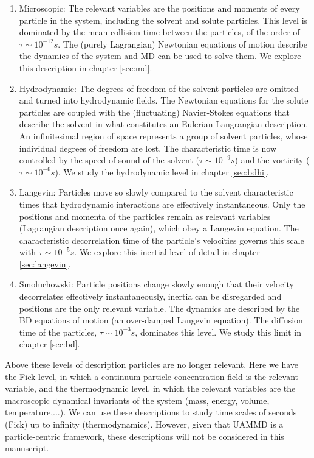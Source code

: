 \documentclass[ twoside,openright,titlepage,numbers=noenddot,%
headinclude,footinclude,cleardoublepage=empty,abstract=on,
BCOR=5mm,paper=b5,fontsize=11pt, dvipsnames
]{scrreprt}
\newcommand{\uammd}{\gls{UAMMD}\xspace}
\begin{document}
\begin{enumerate}
\item Microscopic: The relevant variables are the positions and moments of every particle in the system, including the solvent and solute particles. This level is dominated by the mean collision time between the particles, of the order of $\tau \sim 10^{-12} s$. The (purely Lagrangian) Newtonian equations of motion describe the dynamics of the system and \gls{MD} can be used to solve them. We explore this description in chapter \ref{sec:md}.
\item Hydrodynamic: The degrees of freedom of the solvent particles are omitted and turned into hydrodynamic fields. The Newtonian equations for the solute particles are coupled with the (fluctuating) Navier-Stokes equations that describe the solvent in what constitutes an Eulerian-Langrangian description. An infinitesimal region of space represents a group of solvent particles, whose individual degrees of freedom are lost. The characteristic time is now controlled by the speed of sound of the solvent ($\tau \sim 10^{-9}s$) and the vorticity ($\tau \sim 10^{-6}s$). We study the hydrodynamic level in chapter \ref{sec:bdhi}.
\item Langevin: Particles move so slowly compared to the solvent characteristic times that hydrodynamic interactions are effectively instantaneous. Only the positions and momenta of the particles remain as relevant variables (Lagrangian description once again), which obey a Langevin equation. The characteristic decorrelation time of the particle's velocities governs this scale with $\tau\sim 10^{-5}s$. We explore this inertial level of detail in chapter \ref{sec:langevin}.
\item Smoluchowski: Particle positions change slowly enough that their velocity decorrelates effectively instantaneously, inertia can be disregarded and positions are the only relevant variable. The dynamics are described by the \gls{BD} equations of motion (an over-damped Langevin equation). The diffusion time of the particles, $\tau \sim 10^{-3} s$, dominates this level. We study this limit in chapter \ref{sec:bd}.
\end{enumerate}
Above these levels of description particles are no longer relevant. Here we have the Fick level, in which a continuum particle concentration field is the relevant variable, and the thermodynamic level, in which the relevant variables are the macroscopic dynamical invariants of the system (mass, energy, volume, temperature,...). We can use these descriptions to study time scales of seconds (Fick) up to infinity (thermodynamics). However, given that \uammd is a particle-centric framework, these descriptions will not be considered in this manuscript.
\end{document}

